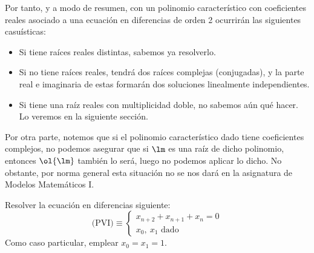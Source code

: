 Por tanto, y a modo de resumen, con un polinomio característico con coeficientes reales asociado a una ecuación en diferencias de orden 2 ocurrirán las siguientes casuísticas:
\begin{itemize}
    \item Si tiene raíces reales distintas, sabemos ya resolverlo.
    \item Si no tiene raíces reales, tendrá dos raíces complejas (conjugadas), y la parte real e imaginaria de estas formarán dos soluciones linealmente independientes.
    \item Si tiene una raíz reales con multiplicidad doble, no sabemos aún qué hacer. Lo veremos en la siguiente sección.
\end{itemize}

Por otra parte, notemos que si el polinomio característico dado tiene coeficientes complejos, no podemos asegurar que si $\lm$ es una raíz de dicho polinomio, entonces $\ol{\lm}$ también lo será, luego no podemos aplicar lo dicho. No obstante, por norma general esta situación no se nos dará en la asignatura de Modelos Matemáticos I.

\begin{ejercicio*}
    Resolver la ecuación en diferencias siguiente:
    \begin{equation*}
        \text{(PVI)}\equiv \left\{\begin{array}{l}
            x_{n+2} + x_{n+1} + x_n = 0 \\
            x_0,~x_1 \text{\ dado}
        \end{array} \right.
    \end{equation*}
    Como caso particular, emplear $x_0=x_1=1$.

    \begin{comment}

    Tenemos que su polinomio característico asociado es:
    \begin{equation*}
        p(\lm) = \lm^2 + \lm + 1
    \end{equation*}

    Sus soluciones son:
    \begin{equation*}
        \lm = \frac{-1+\sqrt{3}i}{2}
        \hspace{2cm} 
        \ol{\lm} = \frac{-1-\sqrt{3}i}{2}
    \end{equation*}

    \end{comment}
\end{ejercicio*}

